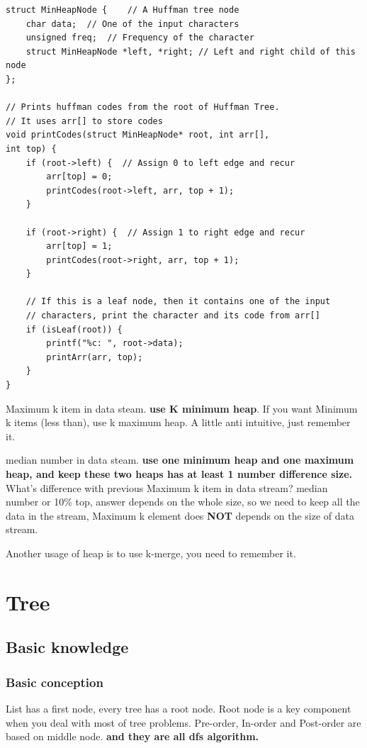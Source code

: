 \documentclass[a4paper,11pt,twoside]{book}
\begin{document}
\begin{lstlisting}
struct MinHeapNode { 	// A Huffman tree node 
	char data;  // One of the input characters 
	unsigned freq;  // Frequency of the character 
	struct MinHeapNode *left, *right; // Left and right child of this node 
}; 

// Prints huffman codes from the root of Huffman Tree. 
// It uses arr[] to store codes 
void printCodes(struct MinHeapNode* root, int arr[], 
int top) { 
	if (root->left) {  // Assign 0 to left edge and recur 
		arr[top] = 0; 
		printCodes(root->left, arr, top + 1); 
	} 

	if (root->right) {  // Assign 1 to right edge and recur 
		arr[top] = 1; 
		printCodes(root->right, arr, top + 1); 
	} 
	
	// If this is a leaf node, then it contains one of the input 
	// characters, print the character and its code from arr[] 
	if (isLeaf(root)) { 
		printf("%c: ", root->data); 
		printArr(arr, top); 
	} 
} 
\end{lstlisting}

	\par Maximum k item in data steam. \textbf{use K minimum heap}. If you want Minimum k items (less than), use k maximum heap. A little anti intuitive, just remember it.

	\par median number in data steam. \textbf{use one minimum heap and one maximum heap, and keep these two heaps has at least 1 number difference size.}  What's difference with previous Maximum k item in data stream? median number or 10\% top,  answer depends on the whole size, so we need to keep all the data in the stream,  Maximum k element does \textbf{NOT} depends on the size of data stream.

 
	\par Another usage of heap is to use k-merge, you need to remember it. 


\section{Tree}
\subsection{Basic knowledge}
\subsubsection{Basic conception}

	
	\par List has a first node, every tree has a root node. Root node is a key component when you deal with most of tree problems. Pre-order, In-order and Post-order are based on middle node. \textbf{and they are all dfs algorithm.}
\end{document}
